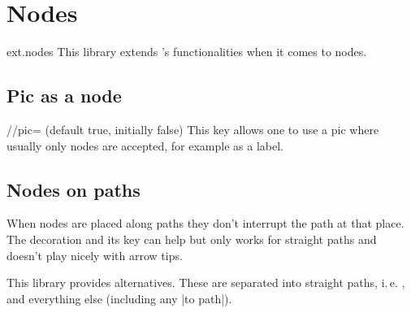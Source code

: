 %
%
%

\section{Nodes}
\begin{tikzlibrary}{ext.nodes}
This library extends \tikzname's functionalities when it comes to nodes.
\end{tikzlibrary}

\begin{multicols}{2}

\subsection{Pic as a node}
\begin{key}{/\tikzext/pic= (default true, initially false)}
This key allows one to use a pic where usually only nodes are accepted,
for example as a label.
\begin{codeexample}[preamble=\usetikzlibrary{ext.nodes, ext.misc}]
\begin{tikzpicture}[
  slsl/.pic={\draw(-2pt, 1.5pt)--( 2pt, .5pt)
                  ( 2pt,-1.5pt)--(-2pt,-.5pt);}]
\node[
  draw, minimum width=3cm, minimum height=1cm,
  label={[ext/pic            ] east:slsl},
  label={[ext/pic, rotate= 90]north:slsl},
  label={[ext/pic            ] west:slsl},
  label={[ext/pic, rotate=-90]south:slsl}]{};
\end{tikzpicture}
\end{codeexample}
\end{key}

\subsection{Nodes on paths}
When nodes are placed along paths they don't interrupt
the path at that place.
The decoration 
and its 
key can help but only works for straight paths and
doesn't play nicely with arrow tips.

This library provides alternatives.
These are separated into straight paths, i.\,e. ,
and everything else (including any |to path|).


\end{multicols}
